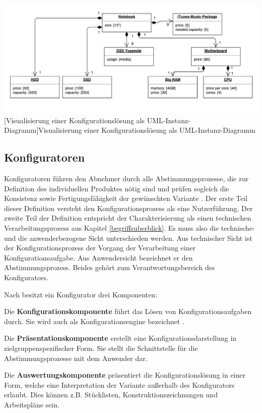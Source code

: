 \documentclass[11pt, a4paper, titlepage, listof=totoc, bibliography=totoc, index=totoc, twoside, openright, headings=normal]{scrreprt}
\begin{document}
\vspace{1em}
\begin{minipage}{\linewidth}
	\centering
	\includegraphics[width=1\linewidth]{Abbildungen/notebookInstanceUML.pdf}
	[Visualisierung einer Konfigurationslösung als UML-Instanz-Diagramm]{Visualisierung einer Konfigurationslösung als UML-Instanz-Diagramm}
	\label{fig:notebookInstanceUML}
\end{minipage}
\vspace{1em}

\subsection{Konfiguratoren}
\label{Konfigurationssysteme}
Konfiguratoren \glqq [...] führen den Abnehmer durch alle Abstimmungsprozesse, die zur Definition des individuellen Produktes nötig sind und prüfen sogleich die Konsistenz sowie Fertigungsfähigkeit der gewünschten Variante\grqq{} \citep{piller06}. Der erste Teil dieser Definition versteht den Konfigurationsprozess als eine Nutzerführung. Der zweite Teil der Definition entspricht der Charakterisierung als einen technischen Verarbeitungsprozess aus Kapitel \ref{begriffsuberblick}. Es muss also die technische- und die anwenderbezogene Sicht unterschieden werden. Aus technischer Sicht ist der Konfigurationsprozess der Vorgang der Verarbeitung einer Konfigurationsaufgabe. Aus Anwendersicht bezeichnet er den Abstimmungsprozess. Beides gehört zum Verantwortungsbereich des Konfigurators.

Nach \citet{piller06} besitzt ein Konfigurator drei Komponenten:
\begin{compactitem}
\item Die \textbf{Konfigurationskomponente} führt das Lösen von Konfigurationsaufgaben durch. Sie wird auch als Konfigurationsengine bezeichnet \citep{tactonProductOverview}.
\item Die \textbf{Präsentationskomponente} erstellt eine Konfigurationsdarstellung in zielgruppenspezifischer Form. Sie stellt die Schnittstelle für die Abstimmungsprozesse mit dem Anwender dar.
\item Die \textbf{Auswertungskomponente} präsentiert die Konfigurationslösung in einer Form, welche eine Interpretation der Variante außerhalb des Konfigurators erlaubt. Dies können z.B. Stücklisten, Konstruktionszeichnungen und Arbeitspläne sein.
\end{compactitem}
\end{document}
